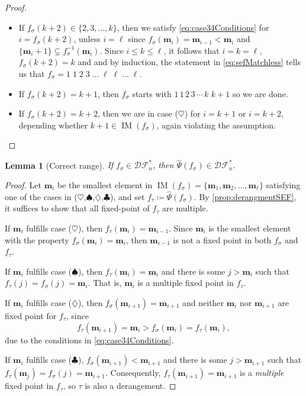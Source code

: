 \documentclass[reqno]{amsart}
\newtheorem{lemma}[theorem]{Lemma}
\theoremstyle{definition}
\newcommand{\DSEF}{\mathcal{DF}}%
\newcommand{\fretherD}{\hat{\Psi}}
\newcommand{\caseOne}{\ensuremath{\heartsuit}}
\newcommand{\caseTwo}{\ensuremath{\spadesuit}}
\newcommand{\caseThree}{\ensuremath{\diamondsuit}}
\newcommand{\caseFour}{\ensuremath{\clubsuit}}
\newcommand{\img}{\mathbf{m}}
\DeclareMathOperator{\supp}{IM}
\begin{document}
\begin{proof}
\begin{itemize}
\item 
If $f_{\sigma}(k+2)\in \{2,3,\dotsc,k\}$, then we 
satisfy \eqref{eq:case34Conditions} for $i=f_{\sigma}(k+2)$,
unless $i=\ell$ since $f_{\sigma}(\img_i)=\img_{i-1}<\img_i$ and 
$\{\img_i+1\}\subsetneq f_{\sigma}^{-1}(\img_i)$. Since 
$i\leq k\leq \ell$, it follows that $i=k=\ell$, $f_\sigma(k+2)=k$ and
and by induction, the statement in \eqref{eq:sefMatchless} tells us that
$f_{\sigma}=1\;1\;2\;3\;\dotsc\;\ell\; \ell \;\dotsc\; \ell$.

\item 
If $f_{\sigma}(k+2)=k+1$, then $f_{\sigma}$ 
starts with $1\,1\,2\,3\,\cdots\,k\,\,k{+}1$ so we are done.

\item 
If $f_{\sigma}(k+2)=k+2$, then we are in 
case (\caseOne) for $i=k+1$ or $i=k+2$, depending whether $k+1 \in 
\supp(f_{\sigma})$, again violating the assumption.
\end{itemize}
\end{proof}




\begin{lemma}[Correct range]\label{lem:correctRange}
If $f_{\sigma}\in \DSEF^*_n$, then $\fretherD(f_{\sigma})\in \DSEF^*_n$.
\end{lemma}
\begin{proof}
Let $\img_i$ be the smallest element in 
$\supp(f_{\sigma})=\{\img_1,\img_2,\ldots,\img_\ell\}$ 
satisfying one of the cases in (\caseOne,\caseTwo,\caseThree,\caseFour),
and set $f_\tau \coloneqq \fretherD(f_{\sigma})$.
By \cref{prop:derangmentSEF}, it suffices to show that all fixed-point of $f_\tau$ are multiple.

If $\img_i$ fulfills case (\caseOne), then 
$f_{\tau}(\img_i)=\img_{i-1}$. Since $\img_i$ is the 
smallest element with the property $f_{\sigma}(\img_i)=\img_i$, 
then $\img_{i-1}$ is not a fixed point in both 
$f_{\sigma}$ and $f_{\tau}$.

If $\img_i$ fulfills case (\caseTwo), then 
$f_{\tau}(\img_i)=\img_{i}$ and there is some $j>\img_i$ such 
that $f_{\tau}(j)=f_{\sigma}(j)=\img_{i}$. That is, 
$\img_i$ is a multiple fixed point in $f_{\tau}$.

If $\img_i$ fulfills case (\caseThree), then $f_{\sigma}(\img_{i+1})=\img_{i+1}$
and neither $\img_{i}$ nor $\img_{i+1}$ are fixed point for $f_{\tau}$,
since 
\[
 f_{\tau}(\img_{i+1}) = \img_{i} > f_{\sigma}(\img_i) = f_{\tau}(\img_i),
\]
due to the conditions in \eqref{eq:case34Conditions}.

If $\img_i$ fulfills case (\caseFour), $f_{\sigma}(\img_{i+1})<\img_{i+1}$
and there is some $j>\img_{i+1}$ such that $f_{\tau}(\img_{j})=f_{\sigma}(j)=\img_{i+1}$.
Consequently, $f_{\tau}(\img_{i+1})=\img_{i+1}$ is a \emph{multiple} fixed point in $f_{\tau}$,
so $\tau$ is also a derangement.
\end{proof}
\end{document}
